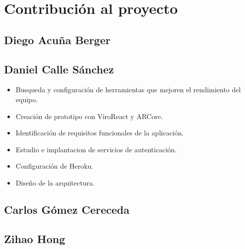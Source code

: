 
\cleardoublepage


\chapter{Contribución al proyecto}
\label{makereference9}

\section{Diego Acuña Berger}
\label{makereference9.1}

\section{Daniel Calle Sánchez}
\label{makereference9.2}
\begin{itemize}  
    \item Busqueda y configuración de herramientas que mejoren el rendimiento del equipo.
    \item Creación de prototipo con ViroReact y ARCore.
    \item Identificación de requisitos funcionales de la aplicación.
    \item Estudio e implantacion de servicios de autenticación.
    \item Configuración de Heroku.
    \item Diseño de la arquitectura.
\end{itemize}

\section{Carlos Gómez Cereceda}
\label{makereference9.3}

\section{Zihao Hong}
\label{makereference9.4}